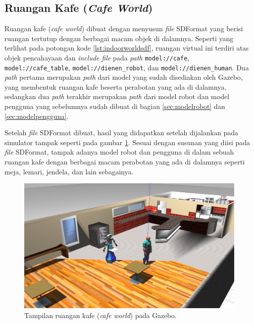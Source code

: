 \subsection{Ruangan Kafe (\emph{Cafe World})}
\label{subsec:lingkunganindoor}

Ruangan kafe (\emph{cafe world}) dibuat dengan menyusun \emph{file} SDFormat yang berisi ruangan tertutup dengan berbagai macam objek di dalamnya.
Seperti yang terlihat pada potongan kode \ref{lst:indoorworldsdf},
  ruangan virtual ini terdiri atas objek pencahayaan dan \emph{include file} pada \emph{path} \lstinline{model://cafe}, \lstinline{model://cafe_table}, \lstinline{model://dienen_robot}, dan \lstinline{model://dienen_human}.
Dua \emph{path} pertama merupakan \emph{path} dari model yang sudah disediakan oleh Gazebo,
  yang membentuk ruangan kafe beserta perabotan yang ada di dalamnya,
  sedangkan dua \emph{path} terakhir merupakan \emph{path} dari model robot dan model pengguna yang sebelumnya sudah dibuat di bagian \ref{sec:modelrobot} dan \ref{sec:modelpengguna}.



Setelah \emph{file} SDFormat dibuat,
  hasil yang didapatkan setelah dijalankan pada simulator tampak seperti pada gambar \ref{fig:lingkunganindoor}.
Sesuai dengan susunan yang diisi pada \emph{file} SDFormat,
  tampak adanya model robot dan pengguna di dalam sebuah ruangan kafe dengan berbagai macam perabotan yang ada di dalamnya seperti meja, lemari, jendela, dan lain sebagainya.

\begin{figure}[ht]
  \centering
  \includegraphics[scale=0.23]{gambar/lingkungan-indoor.png}
  \caption{Tampilan ruangan kafe (\emph{cafe world}) pada Gazebo.}
  \label{fig:lingkunganindoor}
\end{figure}

